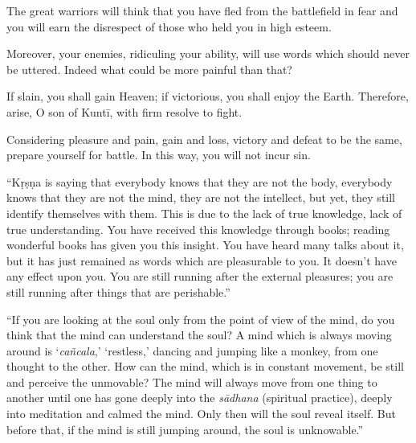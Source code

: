 {The great warriors will think that you have fled from the battlefield in fear and you will earn the disrespect of those who held you in high esteem.}

{Moreover, your enemies, ridiculing your ability, will use words which should never be uttered. Indeed what could be more painful than that?}

{If slain, you shall gain Heaven; if victorious, you shall enjoy the Earth. Therefore, arise, O son of Kuntī, with firm resolve to fight.}

{Considering pleasure and pain, gain and loss, victory and defeat to be the same, prepare yourself for battle. In this way, you will not incur sin.}

\enquote{Kṛṣṇa is saying that everybody knows that they are not the body, everybody knows that they are not the mind, they are not the intellect, but yet, they still identify themselves with them. This is due to the lack of true knowledge, lack of true understanding. You have received this knowledge through books; reading wonderful books has given you this insight. You have heard many talks about it, but it has just remained as words which are pleasurable to you. It doesn’t have any effect upon you. You are still running after the external pleasures; you are still running after things that are perishable.}

\enquote{If you are looking at the soul only from the point of view of the mind, do you think that the mind can understand the soul? A mind which is always moving around is \enquote{\textit{cañcala},} \enquote{restless,} dancing and jumping like a monkey, from one thought to the other. How can the mind, which is in constant movement, be still and perceive the unmovable? The mind will always move from one thing to another until one has gone deeply into the \textit{sādhana} (spiritual practice), deeply into meditation and calmed the mind. Only then will the soul reveal itself. But before that, if the mind is still jumping around, the soul is unknowable.}


